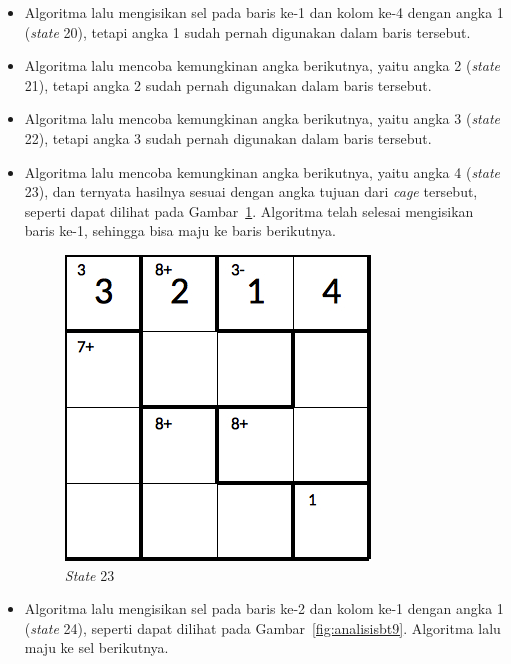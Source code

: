 \documentclass[a4paper,twoside]{article}
\begin{document}
\begin{enumerate}
\begin{itemize}
\item Algoritma lalu mengisikan sel pada baris ke-1 dan kolom ke-4 dengan angka 1 (\textit{state} 20), tetapi angka 1 sudah pernah digunakan dalam baris tersebut.
\item Algoritma lalu mencoba kemungkinan angka berikutnya, yaitu angka 2 (\textit{state} 21), tetapi angka 2 sudah pernah digunakan dalam baris tersebut.
\item Algoritma lalu mencoba kemungkinan angka berikutnya, yaitu angka 3 (\textit{state} 22), tetapi angka 3 sudah pernah digunakan dalam baris tersebut.
\item Algoritma lalu mencoba kemungkinan angka berikutnya, yaitu angka 4 (\textit{state} 23), dan ternyata hasilnya sesuai dengan angka tujuan dari \textit{cage} tersebut, seperti dapat dilihat pada Gambar~\ref{fig:analisisbt8}. Algoritma telah selesai mengisikan baris ke-1, sehingga bisa maju ke baris berikutnya.

\begin{figure}
\centering
\captionsetup{justification=centering}
\includegraphics[scale=0.333]{Gambar/backtracking/State23}
\caption[\textit{State} 23]{\textit{State} 23}
\label{fig:analisisbt8}
\end{figure}

\item Algoritma lalu mengisikan sel pada baris ke-2 dan kolom ke-1 dengan angka 1 (\textit{state} 24), seperti dapat dilihat pada Gambar~\ref{fig:analisisbt9}. Algoritma lalu maju ke sel berikutnya.


\end{itemize}
\end{enumerate}
\end{document}
